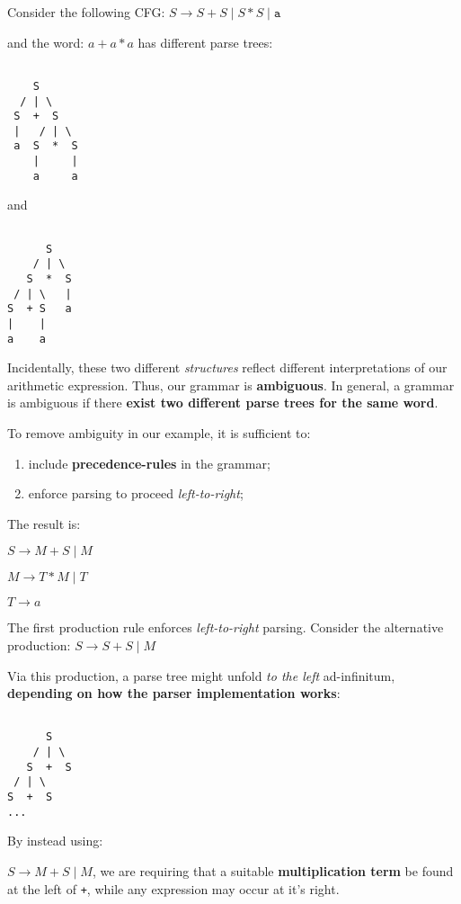 \documentclass[a4paper, 12pt]{article}
\begin{document}
Consider the following CFG:
$S \rightarrow S + S \mid S * S \mid \texttt{a}$

and the word: $a+a*a$ has different parse trees:

\begin{verbatim}

    S
  / | \
 S  +  S
 |   / | \
 a  S  *  S
    |     |
    a     a 

\end{verbatim}

and


\begin{verbatim}

      S
    / | \
   S  *  S
 / | \   |
S  + S   a
|    |
a    a

\end{verbatim}


Incidentally, these two different \textit{structures} reflect different interpretations of our arithmetic expression. Thus, our grammar is \textbf{ambiguous}. In general, a grammar is ambiguous if there \textbf{exist two different parse trees for the same word}.

To remove ambiguity in our example, it is sufficient to:
  \begin{enumerate}
  	\item  include \textbf{precedence-rules} in the grammar;
  	\item  enforce parsing to proceed \textit{left-to-right};
  \end{enumerate}

The result is:

$S\rightarrow M + S \mid M$

$M\rightarrow T * M \mid T$

$T\rightarrow a$

The first production rule enforces \textit{left-to-right} parsing. Consider the alternative production:
$S \rightarrow S + S \mid M$

Via this production, a parse tree might unfold \textit{to the left} ad-infinitum, \textbf{depending on how the parser implementation works}:


\begin{verbatim}

      S
    / | \
   S  +  S
 / | \
S  +  S
... 

\end{verbatim}


By instead using:

$S\rightarrow M + S \mid M$, we are requiring that a suitable \textbf{multiplication term} be found at the left of \texttt{+}, while any expression may occur at it's right.
\end{document}
